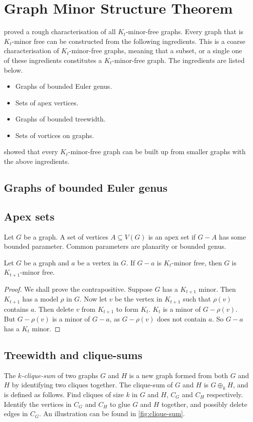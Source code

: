 \section{Graph Minor Structure Theorem}\label{sec:Kt_Minor_Free}
\textcite{robertsonGraphMinorsXVII1999} proved a rough characterisation of all \(K_t\)-minor-free graphs. Every graph that is $K_t$-minor free can be constructed from the following ingredients. This is a coarse characterisation of $K_t$-minor-free graphs, meaning that a subset, or a single one of these ingredients constitutes a $K_t$-minor-free graph. The ingredients are listed below.
\begin{itemize}
	\item Graphs of bounded Euler genus.
	\item Sets of apex vertices.
	\item Graphs of bounded treewidth.
	\item Sets of vortices on graphs.
\end{itemize}
\textcite{robertsonGraphMinorsXVII1999} showed that every \(K_t\)-minor-free graph can be built up from smaller graphs with the above ingredients.

\subsection{Graphs of bounded Euler genus}

\subsection{Apex sets}\label{sssec:Apex_Vertices}
Let $G$ be a graph. A set of vertices $A \subseteq V(G)$ is an apex set if $G - A$ has some bounded parameter. Common parameters are planarity or bounded genus. 
\begin{proposition}
	Let $G$ be a graph and $a$ be a vertex in $G$. If \(G-a\) is \(K_{t}\)-minor free, then $G$ is $K_{t+1}$-minor free. 
\end{proposition}
\begin{proof}
	We shall prove the contrapositive. Suppose \(G\) has a \(K_{t + 1}\) minor. Then \(K_{t + 1}\) has a model $\rho$ in \(G\). Now let \(v\) be the vertex in \(K_{t + 1}\) such that \(\rho(v)\) contains \(a\). Then delete \(v\) from \(K_{t + 1}\) to form $K_t$. \(K_t\) is a minor of \(G - \rho(v)\). But \(G - \rho(v)\) is a minor of \(G - a\), as \(G - \rho(v)\) does not contain \(a\). So \(G - a\) has a \(K_t\) minor. 
\end{proof}
\subsection{Treewidth and clique-sums}\label{sssec:Clique_Sums}
The \textit{\(k\)-clique-sum} of two graphs \(G\) and \(H\) is a new graph formed from both $G$ and $H$ by identifying two cliques together. The clique-sum of $G$ and $H$ is \(G \oplus_k H\), and is defined as follows. Find cliques of size $k$ in \(G\) and \(H\), \(C_G\) and \(C_H\) respectively. Identify the vertices in \(C_G\) and \(C_H\) to glue \(G\) and \(H\) together, and possibly delete edges in $C_G$. An illustration can be found in \cref{fig:clique-sum}. 

